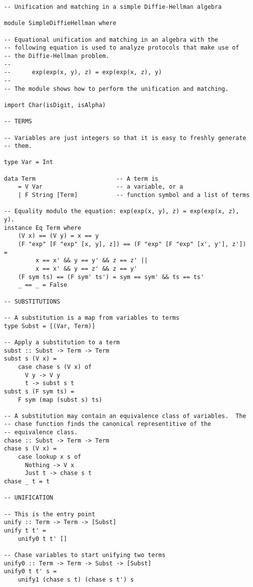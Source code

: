 \documentclass[12pt]{article}
\begin{document}
\begingroup\footnotesize
\begin{verbatim}
-- Unification and matching in a simple Diffie-Hellman algebra

module SimpleDiffieHellman where

-- Equational unification and matching in an algebra with the
-- following equation is used to analyze protocols that make use of
-- the Diffie-Hellman problem.
--
--      exp(exp(x, y), z) = exp(exp(x, z), y)
--
-- The module shows how to perform the unification and matching.

import Char(isDigit, isAlpha)

-- TERMS

-- Variables are just integers so that it is easy to freshly generate
-- them.

type Var = Int

data Term                       -- A term is
    = V Var                     -- a variable, or a
    | F String [Term]           -- function symbol and a list of terms

-- Equality modulo the equation: exp(exp(x, y), z) = exp(exp(x, z), y).
instance Eq Term where
    (V x) == (V y) = x == y
    (F "exp" [F "exp" [x, y], z]) == (F "exp" [F "exp" [x', y'], z']) =
         x == x' && y == y' && z == z' ||
         x == x' && y == z' && z == y'
    (F sym ts) == (F sym' ts') = sym == sym' && ts == ts'
    _ == _ = False

-- SUBSTITUTIONS

-- A substitution is a map from variables to terms
type Subst = [(Var, Term)]

-- Apply a substitution to a term
subst :: Subst -> Term -> Term
subst s (V x) =
    case chase s (V x) of
      V y -> V y
      t -> subst s t
subst s (F sym ts) =
    F sym (map (subst s) ts)

-- A substitution may contain an equivalence class of variables.  The
-- chase function finds the canonical representitive of the
-- equivalence class.
chase :: Subst -> Term -> Term
chase s (V x) =
    case lookup x s of
      Nothing -> V x
      Just t -> chase s t
chase _ t = t

-- UNIFICATION

-- This is the entry point
unify :: Term -> Term -> [Subst]
unify t t' =
    unify0 t t' []

-- Chase variables to start unifying two terms
unify0 :: Term -> Term -> Subst -> [Subst]
unify0 t t' s =
    unify1 (chase s t) (chase s t') s


\end{verbatim}
\end{document}
